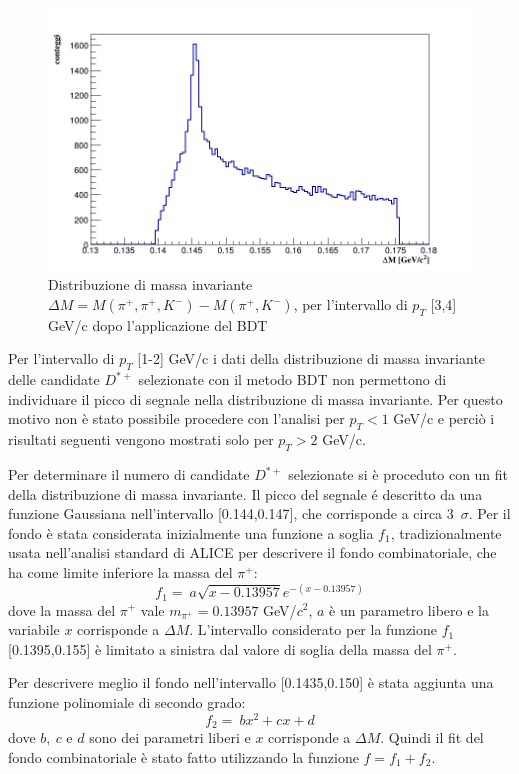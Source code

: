  \begin{figure}[htbp] 
        \centering
        \includegraphics[width=0.7\linewidth]{AnalisiDati/diffDstarD0_3_4BDT.png}
        \caption{Distribuzione di massa invariante $\Delta M = M(\pi^+,\pi^+,K^-) - M(\pi^+,K^-)$, per l'intervallo di $p_T$ [3,4] GeV/c dopo l'applicazione del BDT}
        \label{fig:diffDstarD0_3_4_BDT}
    \end{figure}
 
Per l'intervallo di $p_T$ [1-2] GeV/c i dati della distribuzione di massa invariante delle candidate $D^{*+}$ selezionate con il metodo BDT non permettono di individuare il picco di segnale nella distribuzione di massa invariante. Per questo motivo non \`e stato possibile procedere con l'analisi per $p_T < 1$ GeV/c e perciò i risultati seguenti vengono mostrati solo per $p_T > 2$ GeV/c.   

Per determinare il numero di candidate $D^{*+}$ selezionate si è proceduto con un fit della distribuzione di massa invariante. 
Il picco del segnale é descritto da una funzione Gaussiana nell'intervallo [0.144,0.147], che corrisponde a circa 3~$\sigma$.
Per il fondo \`e stata considerata inizialmente una funzione a soglia $f_1$, tradizionalmente usata nell'analisi standard di ALICE per descrivere il fondo combinatoriale, che ha come limite inferiore la massa del $\pi^+$:
\begin{equation}
        f_1  = \ a \sqrt{x-0.13957} e^{- (x - 0.13957) }
    \end{equation}
dove la massa del $\pi^+$ vale $m_{\pi^+} = 0.13957$ GeV/$c^2$, $a$ \`e un parametro libero e la variabile $x$ corrisponde a $\Delta M$. L'intervallo considerato per la funzione $f_1$ [0.1395,0.155] \`e limitato a sinistra dal valore di soglia della massa del $\pi^+$. 
    
Per descrivere meglio il fondo nell'intervallo [0.1435,0.150] \`e stata aggiunta una funzione polinomiale di secondo grado:     
    \begin{equation}
        f_2 = \ b x^2 + c x + d
    \end{equation}
dove $b, \ c$ e $d$ sono dei parametri liberi e $x$ corrisponde a $\Delta M$. Quindi il fit del fondo combinatoriale \`e stato fatto utilizzando la funzione $f = f_1 + f_2$.

